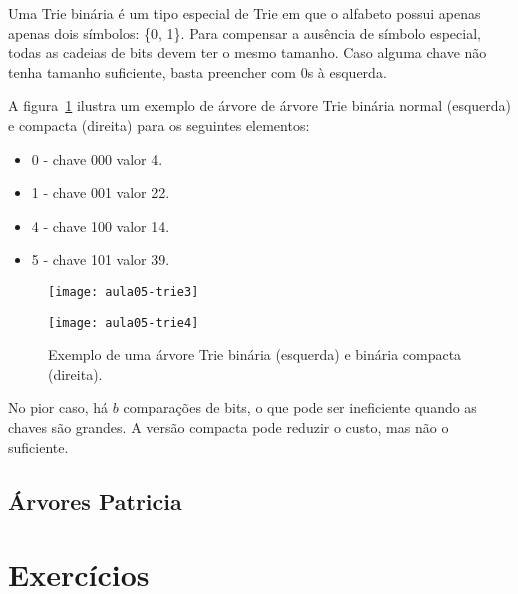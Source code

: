 Uma Trie binária é um tipo especial de Trie em que o alfabeto possui apenas 
apenas dois símbolos: \{0, 1\}.
Para compensar a ausência de símbolo especial, todas as cadeias de bits devem
ter o mesmo tamanho.
Caso alguma chave não tenha tamanho suficiente, basta preencher com 0s à
esquerda.

A figura~\ref{aula05:fig:trie3} ilustra um exemplo de árvore de árvore Trie binária
normal (esquerda) e compacta (direita) para os seguintes elementos:
\begin{itemize}
\item 0 - chave 000 valor 4.
\item 1 - chave 001 valor 22.
\item 4 - chave 100 valor 14.
\item 5 - chave 101 valor 39.
\end{itemize}
%
\begin{figure}[!htb]
\centering
  \begin{minipage}{0.4\textwidth}
	\centering
	\texttt{[image: aula05-trie3]}
  \end{minipage}
  \vline
  \begin{minipage}{0.4\textwidth}
	\centering
	\texttt{[image: aula05-trie4]}
  \end{minipage}
\caption{Exemplo de uma árvore Trie binária (esquerda) e binária compacta (direita).}
\label{aula05:fig:trie3}
\end{figure}

No pior caso, há $b$ comparações de bits, o que pode ser ineficiente quando as
chaves são grandes.  A versão compacta pode reduzir o custo, mas não o
suficiente.

\subsection{Árvores Patricia}

\section{Exercícios}

